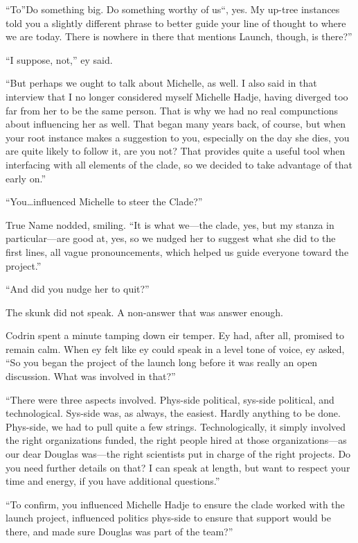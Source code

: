 ``To''Do something big. Do something worthy of us``, yes. My up-tree instances told you a slightly different phrase to better guide your line of thought to where we are today. There is nowhere in there that mentions Launch, though, is there?''

``I suppose, not,'' ey said.

``But perhaps we ought to talk about Michelle, as well. I also said in that interview that I no longer considered myself Michelle Hadje, having diverged too far from her to be the same person. That is why we had no real compunctions about influencing her as well. That began many years back, of course, but when your root instance makes a suggestion to you, especially on the day she dies, you are quite likely to follow it, are you not? That provides quite a useful tool when interfacing with all elements of the clade, so we decided to take advantage of that early on.''

``You\ldots influenced Michelle to steer the Clade?''

True Name nodded, smiling. ``It is what we---the clade, yes, but my stanza in particular---are good at, yes, so we nudged her to suggest what she did to the first lines, all vague pronouncements, which helped us guide everyone toward the project.''

``And did you nudge her to quit?''

The skunk did not speak. A non-answer that was answer enough.

Codrin spent a minute tamping down eir temper. Ey had, after all, promised to remain calm. When ey felt like ey could speak in a level tone of voice, ey asked, ``So you began the project of the launch long before it was really an open discussion. What was involved in that?''

``There were three aspects involved. Phys-side political, sys-side political, and technological. Sys-side was, as always, the easiest. Hardly anything to be done. Phys-side, we had to pull quite a few strings. Technologically, it simply involved the right organizations funded, the right people hired at those organizations---as our dear Douglas was---the right scientists put in charge of the right projects. Do you need further details on that? I can speak at length, but want to respect your time and energy, if you have additional questions.''

``To confirm, you influenced Michelle Hadje to ensure the clade worked with the launch project, influenced politics phys-side to ensure that support would be there, and made sure Douglas was part of the team?''

